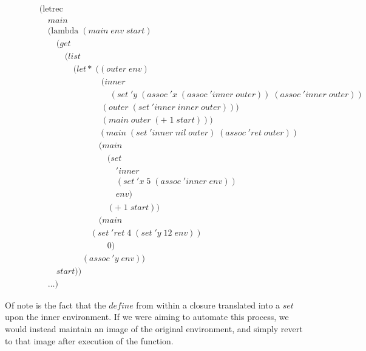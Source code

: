 \clearpage
\begin{figure}[ht]
\caption{}\label{scheme}
\begin{align*}
& (\text{letrec} \; 
\\& \quad main \; 
\\& \quad (\text{lambda} \; (main \; env \; start)
\\& \qquad (get \; 
\\& \qquad \quad (list \; 
\\& \qquad \qquad (let* \; ((outer \; env)
\\& \qquad \qquad \qquad \quad \; (inner \; 
\\& \qquad \qquad \qquad \qquad \; (set \; 'y \; (assoc \; 'x \; (assoc \; 'inner \; outer)) \; (assoc \; 'inner \; outer))
\\& \qquad \qquad \qquad \quad \; (outer \; (set \; 'inner \; inner \; outer)))
\\& \qquad \qquad \qquad \quad \; (main \; outer \; (+ \; 1 \; start)))
\\& \qquad \qquad \qquad \quad (main \; (set \; 'inner \; nil \; outer) \; (assoc \; 'ret \; outer))
\\& \qquad \qquad \qquad \quad (main \; 
\\& \qquad \qquad \qquad \qquad (set \; 
\\& \qquad \qquad \qquad \qquad \quad 'inner \; 
\\& \qquad \qquad \qquad \qquad \quad (set \; 'x \; 5 \; (assoc \; 'inner \; env)) \; 
\\& \qquad \qquad \qquad \qquad \quad env) \; 
\\& \qquad \qquad \qquad \qquad (+ \; 1 \; start))
\\& \qquad \qquad \qquad \quad (main \; 
\\& \qquad \qquad \qquad (set \; 'ret \; 4 \; (set \; 'y \; 12 \; env)) \; 
\\& \qquad \qquad \qquad \qquad 0)
\\& \qquad \qquad \quad (assoc \; 'y \; env)) \; 
\\& \qquad start))
\\& \quad \dots)
\end{align*}
\end{figure}

Of note is the fact that the $define$ from within a closure translated into a $set$
upon the inner environment. If we were aiming to automate this process, we would
instead maintain an image of the original environment, and simply revert to that 
image after execution of the function.

